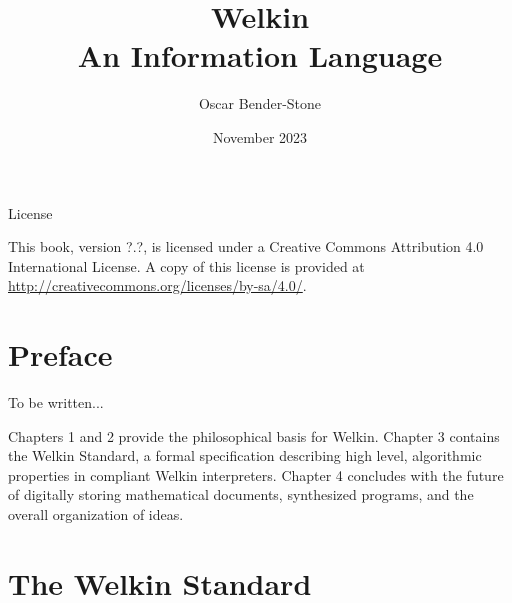 \documentclass[oneside, leqno]{book}
\title{Welkin \\
  An Information Language}
\author{Oscar Bender-Stone}
\date{November 2023}
\theoremstyle{definition}
\begin{document}
\maketitle


\begin{center}
{\sc License}\

\vspace{2ex}
This book, version ?.?, is licensed under a Creative Commons Attribution 4.0 International License.
A copy of this license is provided at \url{http://creativecommons.org/licenses/by-sa/4.0/}.
\end{center}

\newpage

\chapter*{Preface}

To be written...


Chapters 1 and 2 provide the philosophical basis for Welkin. Chapter 3 contains the Welkin Standard, a formal specification describing high level, algorithmic properties in compliant Welkin interpreters. Chapter 4 concludes with the future of digitally storing mathematical documents, synthesized programs, and the overall organization of ideas.


\mainmatter



\chapter{The Welkin Standard}


\end{document}
